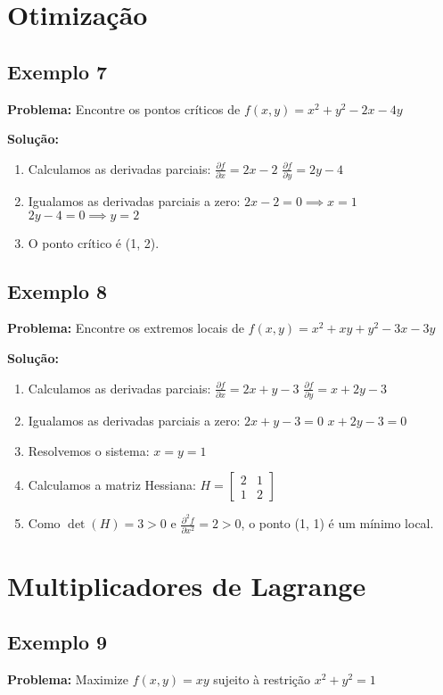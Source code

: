 \section{Otimização}

\subsection{Exemplo 7}
\textbf{Problema:} Encontre os pontos críticos de $f(x,y) = x^2 + y^2 - 2x - 4y$

\textbf{Solução:}
\begin{enumerate}
\item Calculamos as derivadas parciais:
$\frac{\partial f}{\partial x} = 2x - 2$
$\frac{\partial f}{\partial y} = 2y - 4$
\item Igualamos as derivadas parciais a zero:
$2x - 2 = 0 \implies x = 1$
$2y - 4 = 0 \implies y = 2$
\item O ponto crítico é (1, 2).
\end{enumerate}

\subsection{Exemplo 8}
\textbf{Problema:} Encontre os extremos locais de $f(x,y) = x^2 + xy + y^2 - 3x - 3y$

\textbf{Solução:}
\begin{enumerate}
\item Calculamos as derivadas parciais:
$\frac{\partial f}{\partial x} = 2x + y - 3$
$\frac{\partial f}{\partial y} = x + 2y - 3$
\item Igualamos as derivadas parciais a zero:
$2x + y - 3 = 0$
$x + 2y - 3 = 0$
\item Resolvemos o sistema:
$x = y = 1$
\item Calculamos a matriz Hessiana:
$H = \begin{bmatrix} 2 & 1 \\ 1 & 2 \end{bmatrix}$
\item Como $\det(H) = 3 > 0$ e $\frac{\partial^2 f}{\partial x^2} = 2 > 0$, o ponto (1, 1) é um mínimo local.
\end{enumerate}

\section{Multiplicadores de Lagrange}

\subsection{Exemplo 9}
\textbf{Problema:} Maximize $f(x,y) = xy$ sujeito à restrição $x^2 + y^2 = 1$

